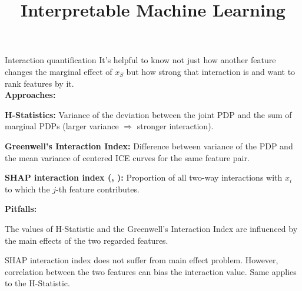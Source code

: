 \documentclass[10pt,compress,t,notes=noshow,xcolor=table]{beamer}
\title{Interpretable Machine Learning}
\begin{document}


\begin{framev}[align=top]{Interaction quantification}
It's helpful to know not just how another feature changes the marginal effect of $x_S$ but how strong that interaction is and want to rank features by it.
\\
\spacer[0.25]
\textbf{Approaches:}
\begin{itemizeM}
\item \textbf{H-Statistics:} Variance of the deviation between the joint PDP and the sum of marginal PDPs (larger variance $\Rightarrow$ stronger interaction).
\item \textbf{Greenwell’s Interaction Index:} Difference between variance of the PDP and the mean variance of centered ICE curves for the same feature pair.
\item \textbf{SHAP interaction index (, ):} Proportion of all two-way interactions with $x_i$ to which the $j$-th feature contributes.
\end{itemizeM}
\pause
\textbf{Pitfalls:}
\begin{itemizeM}
\item The values of H-Statistic and the Greenwell’s Interaction Index are influenced by the main effects of the two regarded features.
\item SHAP interaction index does not suffer from main effect problem. However, correlation between the two features can bias the interaction value. Same applies to the H-Statistic.
\end{itemizeM}
\end{framev}
\end{document}
